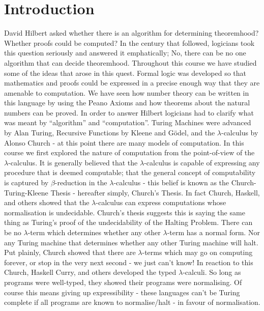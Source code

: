\documentclass{book}
\begin{document}
    \newpage
    \section{Introduction}

        David Hilbert asked whether there is an algorithm for determining theoremhood? Whether proofs could be computed? In the century that followed, logicians took this question seriously and answered it emphatically; No, there can be no one algorithm that can decide theoremhood. Throughout this course we have studied some of the ideas that arose in this quest. Formal logic was developed so that mathematics and proofs could be expressed in a precise enough way that they are amenable to computation. We have seen how number theory can be written in this language by using the Peano Axioms and how theorems about the natural numbers can be proved. In order to answer Hilbert logicians had to clarify what was meant by ``algorithm'' and ``computation''. Turing Machines were advanced by Alan Turing, Recursive Functions by Kleene and G\"{o}del, and the $\lambda$-calculus by Alonso Church - at this point there are many models of computation. In this course we first explored the nature of computation from the point-of-view of the $\lambda$-calculus. It is generally believed that the $\lambda$-calculus is capable of expressing any procedure that is deemed computable; that the general concept of computability is captured by $\beta$-reduction in the $\lambda$-calculus - this belief is known as the Church-Turing-Kleene Thesis - hereafter simply, Church's Thesis. In fact Church, Haskell, and others showed that the $\lambda$-calculus can express computations whose normalisation is undecidable. Church's thesis suggests this is saying the same thing as Turing's proof of the undecidability of the Halting Problem. There can be no $\lambda$-term which determines whether any other $\lambda$-term has a normal form. Nor any Turing machine that determines whether any other Turing machine will halt. Put plainly, Church showed that there are $\lambda$-terms which may go on computing forever, or stop in the very next second - we just can't know! In reaction to this Church, Haskell Curry, and others developed the typed $\lambda$-calculi. So long as programs were well-typed, they showed their programs were normalising. Of course this means giving up expressibility - these languages can't be Turing complete if all programs are known to normalise/halt - in favour of normalisation. 
        
\end{document}
